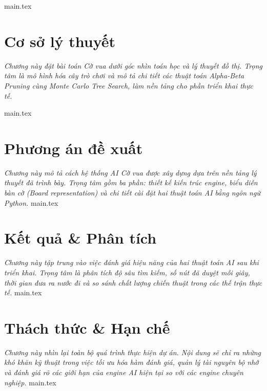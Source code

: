 \documentclass[12pt, a4paper]{report}
\theoremstyle{definition}
\begin{document}
{main.tex}






\chapter{Cơ sở lý thuyết}
\label{chap:design}
\thispagestyle{fancy}
\textit{Chương này đặt bài toán Cờ vua dưới góc nhìn toán học và lý thuyết đồ thị. Trọng tâm là mô hình hóa cây trò chơi và mô tả chi tiết các thuật toán Alpha-Beta Pruning cùng Monte Carlo Tree Search, làm nền tảng cho phần triển khai thực tế.}

{main.tex}

\chapter{Phương án đề xuất}
\label{chap:methodologies}
\thispagestyle{fancy}
\textit{Chương này mô tả cách hệ thống AI Cờ vua được xây dựng dựa trên nền tảng lý thuyết đã trình bày. Trọng tâm gồm ba phần: thiết kế kiến trúc engine, biểu diễn bàn cờ (Board representation) và chi tiết cài đặt hai thuật toán AI bằng ngôn ngữ Python.}
{main.tex}

\chapter{Kết quả \& Phân tích}
\label{chap:results}
\thispagestyle{fancy}
\textit{Chương này tập trung vào việc đánh giá hiệu năng của hai thuật toán AI sau khi triển khai. Trọng tâm là phân tích độ sâu tìm kiếm, số nút đã duyệt mỗi giây, thời gian đưa ra nước đi và so sánh chất lượng chiến thuật trong các thế trận thực tế.}
{main.tex}

\chapter{Thách thức \& Hạn chế}
\label{chap:challenge}
\thispagestyle{fancy}
\textit{Chương này nhìn lại toàn bộ quá trình thực hiện dự án. Nội dung sẽ chỉ ra những khó khăn kỹ thuật trong việc tối ưu hóa hàm đánh giá, quản lý tài nguyên bộ nhớ và đánh giá rõ các giới hạn của engine AI hiện tại so với các engine chuyên nghiệp.}
{main.tex}
\end{document}
